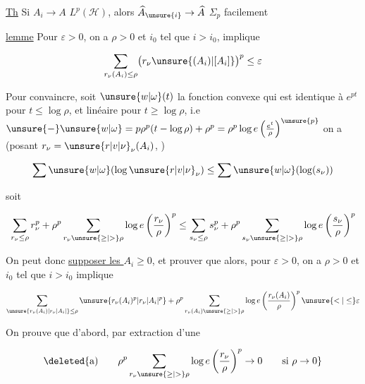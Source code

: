 \uline{Th} Si $A_i\to A$  $L^p(\mathscr H)$, alors $\widehat A_{\unsure{i}}\to\widehat A$  $\Sigma_p$
 facilement 

\uline{lemme} Pour  $\varepsilon>0$, on a $\rho>0$ et $i_0$ tel que $i>i_0$, implique

\[
\sum_{r_\nu(A_i)\leq\rho}\bigl(r_\nu\unsure{(A_i)|[A_i]}\bigr)^p\leq\varepsilon
\]

Pour  convaincre, soit $\unsure{w|\omega}(t)$ la fonction convexe qui est identique à $e^{pt}$ pour $t\leq\log\rho$, et linéaire pour $t\geq\log\rho$, i.e $\unsure{-}\unsure{w|\omega}=p\rho^p(t-\log\rho)+\rho^p=\rho^p\log e\left(\frac{e^t}{\rho}\right)^{\unsure{p}}$ on a (posant $r_\nu=\unsure{r|v|\nu}_\nu(A_i)$, )


\[
\sum \unsure{w|\omega}(\log\unsure{r|v|\nu}_\nu)\leq\sum \unsure{w|\omega}(\log(s_\nu))
\]

soit

\[
\sum_{r_\nu\leq\rho}r_\nu^p+\rho^p\sum_{r_\nu\unsure{\geq|>}\rho}\log e\left(\frac{r_\nu}{\rho}\right)^p
\leq\sum_{s_\nu\leq\rho}s_\nu^p+\rho^p\sum_{s_\nu\unsure{\geq|>}\rho}\log e\left(\frac{s_\nu}{\rho}\right)^p
\]

On peut donc \uline{supposer les $A_i\geq0$},  et prouver que alors, pour  $\varepsilon>0$, on a $\rho>0$ et $i_0$ tel que $i>i_0$ implique

\[
\sum_{\unsure{r_\nu(A_i)|r_\nu\lvert A_i\rvert}\leq\rho}\unsure{r_\nu(A_i)^p|r_\nu\lvert A_i\rvert^p}
+\rho^p\sum_{r_\nu(A_i)\unsure{\geq|>}\rho}\log e\left(\frac{r_\nu(A_i)}{\rho}\right)^p\unsure{<|\leq}\varepsilon
\]

On prouve que d'abord, par extraction d'une 


\[
\deleted{\text{a)}\qquad\rho^p\sum_{r_\nu\unsure{\geq|>}\rho}\log e\left(\frac{r_\nu}{\rho}\right)^p\to0\qquad\text{si }\rho\to0}
\]

